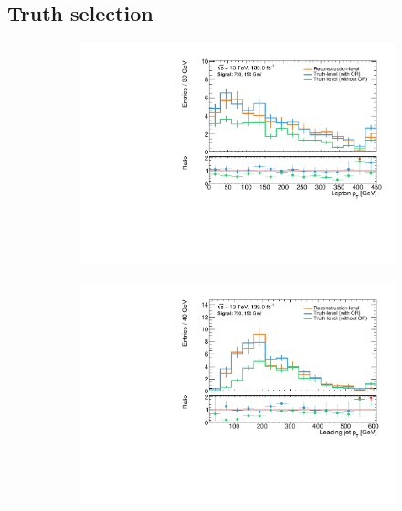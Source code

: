 \subsection{Truth selection}\label{sec:truth_selection}

 \begin{figure}
	\centering
	\begin{subfigure}[b]{0.45\linewidth}
		\centering\includegraphics[width=\textwidth]{20210324_noLabel_noOR/700_150/lep1Pt_C1N2_Wh_hbb_700p0_150p0_smeared.pdf}
	\end{subfigure}\hfill
	\begin{subfigure}[b]{0.45\linewidth}
		\centering\includegraphics[width=\textwidth]{20210324_noLabel_noOR/700_150/jet1Pt_C1N2_Wh_hbb_700p0_150p0_smeared.pdf}
	\end{subfigure}\hfill

\end{figure}
